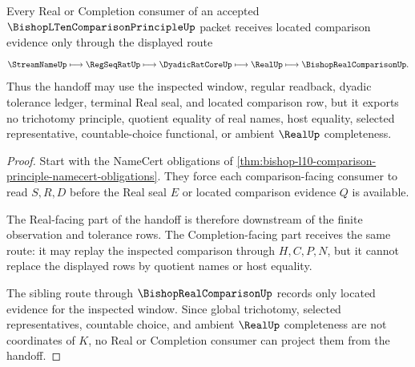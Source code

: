 \begin{theorem}
\label{thm:bishop-l10-comparison-principle-real-completion-handoff}
Every Real or Completion consumer of an accepted $\BishopLTenComparisonPrincipleUp$ packet receives located comparison evidence only through the displayed route
$$
\StreamNameUp \longmapsto \RegSeqRatUp \longmapsto \DyadicRatCoreUp \longmapsto \RealUp \longmapsto \BishopRealComparisonUp .
$$
Thus the handoff may use the inspected window, regular readback, dyadic tolerance ledger, terminal Real seal, and located comparison row, but it exports no trichotomy principle, quotient equality of real names, host equality, selected representative, countable-choice functional, or ambient $\RealUp$ completeness.
\end{theorem}
\begin{proof}
Start with the NameCert obligations of \autoref{thm:bishop-l10-comparison-principle-namecert-obligations}. They force each comparison-facing consumer to read $S,R,D$ before the Real seal $E$ or located comparison evidence $Q$ is available.

The Real-facing part of the handoff is therefore downstream of the finite observation and tolerance rows. The Completion-facing part receives the same route: it may replay the inspected comparison through $H,C,P,N$, but it cannot replace the displayed rows by quotient names or host equality.

The sibling route through $\BishopRealComparisonUp$ records only located evidence for the inspected window. Since global trichotomy, selected representatives, countable choice, and ambient $\RealUp$ completeness are not coordinates of $K$, no Real or Completion consumer can project them from the handoff.
\end{proof}



